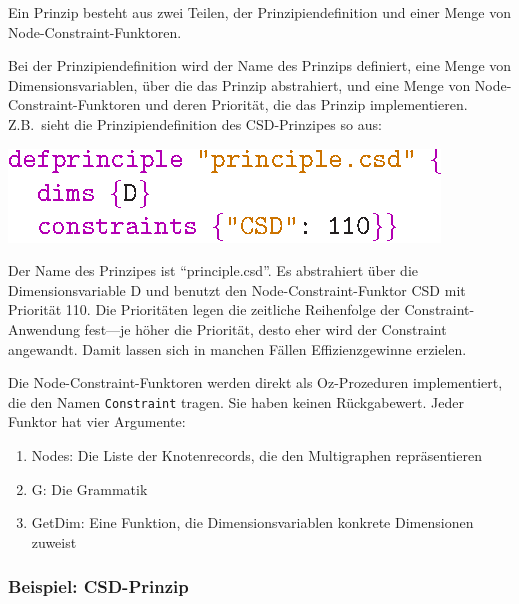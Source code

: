 Ein Prinzip besteht aus zwei Teilen, der Prinzipiendefinition und
einer Menge von Node-Constraint-Funktoren. 

Bei der Prinzipiendefinition wird der Name des Prinzips definiert,
eine Menge von Dimensionsvariablen, \"uber die das Prinzip
abstrahiert, und eine Menge von Node-Constraint-Funktoren und deren
Priorit{\"a}t, die das Prinzip implementieren. Z.B.\ sieht die
Prinzipiendefinition des CSD-Prinzipes so aus:
\begin{center}
\includegraphics[scale=1.0]{eps/defprinciple}
\end{center}
Der Name des Prinzipes ist ``principle.csd''. Es abstrahiert \"uber
die Dimensionsvariable D und benutzt den Node-Constraint-Funktor CSD
mit Priorit\"at 110. Die Priorit\"aten legen die zeitliche Reihenfolge
der Constraint-Anwendung fest---je h\"oher die Priorit\"at, desto eher
wird der Constraint angewandt. Damit lassen sich in manchen F\"allen
Effizienzgewinne erzielen.

Die Node-Constraint-Funktoren werden direkt als Oz-Prozeduren
implementiert, die den Namen {\tt Constraint} tragen. Sie haben keinen
R\"uckgabewert. Jeder Funktor hat vier Argumente:
\begin{enumerate}
\item Nodes: Die Liste der Knotenrecords, die den Multigraphen
repr\"asentieren
\item G: Die Grammatik
\item GetDim: Eine Funktion, die Dimensionsvariablen konkrete Dimensionen
zuweist
\end{enumerate}

 
\subsubsection{Beispiel: CSD-Prinzip}

